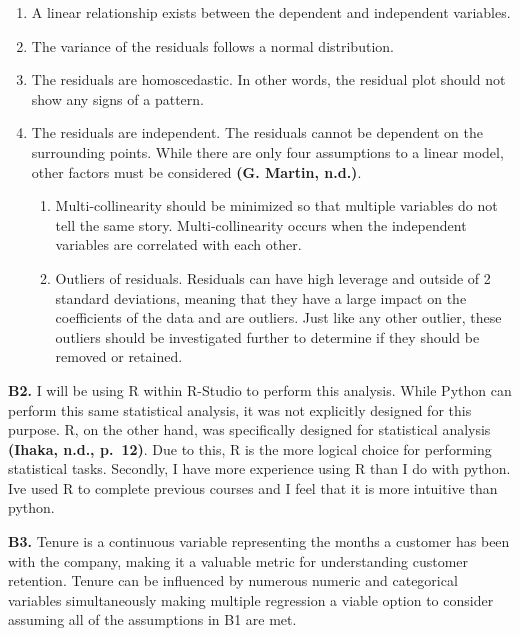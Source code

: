 \documentclass[
]{article}
\begin{document}
\begin{enumerate}
\def\labelenumi{\arabic{enumi}.}
\item
  A linear relationship exists between the dependent and independent
  variables.
\item
  The variance of the residuals follows a normal distribution.
\item
  The residuals are homoscedastic. In other words, the residual plot
  should not show any signs of a pattern.
\item
  The residuals are independent. The residuals cannot be dependent on
  the surrounding points. While there are only four assumptions to a
  linear model, other factors must be considered \textbf{(G. Martin,
  n.d.)}.

  \begin{enumerate}
  \def\labelenumii{\arabic{enumii}.}
  \item
    Multi-collinearity should be minimized so that multiple variables do
    not tell the same story. Multi-collinearity occurs when the
    independent variables are correlated with each other.
  \item
    Outliers of residuals. Residuals can have high leverage and outside
    of 2 standard deviations, meaning that they have a large impact on
    the coefficients of the data and are outliers. Just like any other
    outlier, these outliers should be investigated further to determine
    if they should be removed or retained.
  \end{enumerate}
\end{enumerate}

\textbf{B2.} I will be using R within R-Studio to perform this analysis.
While Python can perform this same statistical analysis, it was not
explicitly designed for this purpose. R, on the other hand, was
specifically designed for statistical analysis \textbf{(Ihaka, n.d.,
p.~12)}. Due to this, R is the more logical choice for performing
statistical tasks. Secondly, I have more experience using R than I do
with python. Ive used R to complete previous courses and I feel that it
is more intuitive than python.~

\textbf{B3.} Tenure is a continuous variable representing the months a
customer has been with the company, making it a valuable metric for
understanding customer retention. Tenure can be influenced by numerous
numeric and categorical variables simultaneously making multiple
regression a viable option to consider assuming all of the assumptions
in B1 are met.~
\end{document}
